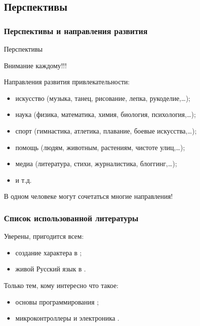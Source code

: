     
\subsection{Перспективы}

\begin{frame}
    \frametitle{Перспективы и направления развития}
    
    \begin{block}{Перспективы}
        \begin{center}
            Внимание \alert{каждому}!!!
        \end{center}
    \end{block}
    
    Направления развития \alert{привлекательности}:
    \begin{itemize}
        \item искусство (музыка, танец, рисование, лепка, рукоделие,\ldots);
        \item наука (физика, математика, химия, биология, психология,\ldots);
        \item спорт (гимнастика, атлетика, плавание, боевые искусства,\ldots);
        \item помощь (людям, животным, растениям, чистоте улиц,\ldots);
        \item медиа (литература, стихи, журналистика, блоггинг,\ldots);
        \item и т.д.
    \end{itemize}
    
    \begin{block}{}
        \begin{center}
            В \alert{одном} человеке могут сочетаться \alert{многие} направления!
        \end{center}
    \end{block}
    
\end{frame}


\appendix

\begin{frame}
    \frametitle{Список использованной литературы}

    Уверены, пригодится \alert{всем}:
    \begin{itemize}
        \item создание характера в \cite{bib:kovey:sevenHabits};
        \item живой Русский язык в \cite{bib:gal:WordLiveAndDeath}.
    \end{itemize}
    
    \par\bigskip
    
    Только тем, кому интересно что такое:
    \begin{itemize}
        \item основы программирования \cite{bib:kernigan:practice};
        \item микроконтроллеры и электроника \cite{bib:petin:Arduino}.
    \end{itemize}
\end{frame}

